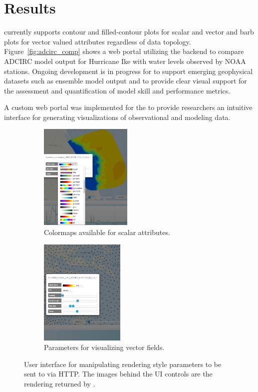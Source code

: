 \section{Results}
\label{sec:results}
\sciwms{} currently supports contour and filled-contour plots for
scalar and vector and barb plots for vector valued attributes
regardless of data topology. Figure~\ref{fig:adcirc_comp} shows a web
portal utilizing the \sciwms{} backend to compare ADCIRC model output
for Hurricane Ike with water levels observed by NOAA stations. Ongoing
development is in progress for \sciwms{} to support emerging
geophysical datasets such as ensemble model output and to provide
clear visual support for the assessment and quantification of model
skill and performance metrics.

A custom web portal was implemented for the \comt{} \ioos{} to provide researchers an intuitive interface for generating visualizations of observational and modeling data. 

\begin{figure}[ht!]
  \centering
  \begin{subfigure}[t]{0.45\textwidth}
    \centering
    \includegraphics[height=2in]{../figs/inundation_extratropical_VIMS_SELFE_2005_final_run_waves_UI_scalar}
    \caption{Colormaps available for scalar attributes.}
  \end{subfigure}
  \begin{subfigure}[t]{0.45\textwidth}
    \centering
    \includegraphics[height=2in]{../figs/ui_vectors_crop_inundation_tropical_UND_ADCIRC_Hurricane_Ike_3d_final_run_with_waves}
    \caption{Parameters for visualizing vector fields.}
  \end{subfigure}
  \caption{User interface for manipulating rendering style parameters
    to be sent to \sciwms{} via HTTP. The images behind the UI
    controls are the rendering returned by \sciwms{}.}
\end{figure}

